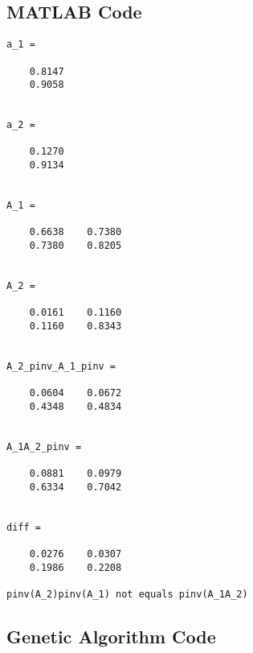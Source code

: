 \documentclass[11pt]{article}
\begin{document}
\subsection*{MATLAB Code}

\begin{lstlisting}[caption={Output of Problem-1 (for default seed)},label={lst:p1_op}]
a_1 =

    0.8147
    0.9058


a_2 =

    0.1270
    0.9134


A_1 =

    0.6638    0.7380
    0.7380    0.8205


A_2 =

    0.0161    0.1160
    0.1160    0.8343


A_2_pinv_A_1_pinv =

    0.0604    0.0672
    0.4348    0.4834


A_1A_2_pinv =

    0.0881    0.0979
    0.6334    0.7042


diff =

    0.0276    0.0307
    0.1986    0.2208

pinv(A_2)pinv(A_1) not equals pinv(A_1A_2)
\end{lstlisting}
%



\subsection*{Genetic Algorithm Code}









\end{document}
